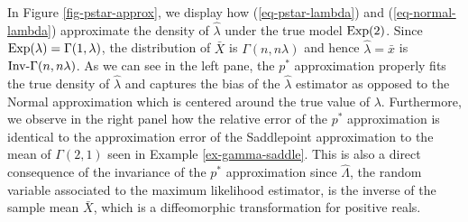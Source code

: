 \begin{example}
    In Figure \ref{fig-pstar-approx}, we display how (\ref{eq-pstar-lambda}) and (\ref{eq-normal-lambda}) approximate the density of $\hat\lambda$ under the true model ${\textrm{Exp}}(2)$. Since ${\textrm{Exp}}(\lambda) = \Gamma(1, \lambda)$, the distribution of $\bar X$ is $\Gamma(n, n\lambda)$ and hence $\hat\lambda = \bar x$ is ${\textrm{Inv-}}\Gamma(n, n\lambda)$. As we can see in the left pane, the $p^*$ approximation properly fits the true density of $\hat\lambda$ and captures the bias of the $\hat\lambda$ estimator as opposed to the Normal approximation which is centered around the true value of $\lambda$. Furthermore, we observe in the right panel how the relative error of the $p^*$ approximation is identical to the approximation error of the Saddlepoint approximation to the mean of $\Gamma(2, 1)$ seen in Example \ref{ex-gamma-saddle}. This is also a direct consequence of the invariance of the $p^*$ approximation since $\hat\Lambda$, the random variable associated to the maximum likelihood estimator, is the inverse of the sample mean $\bar X$, which is a diffeomorphic transformation for positive reals.
    

    

\end{example}
